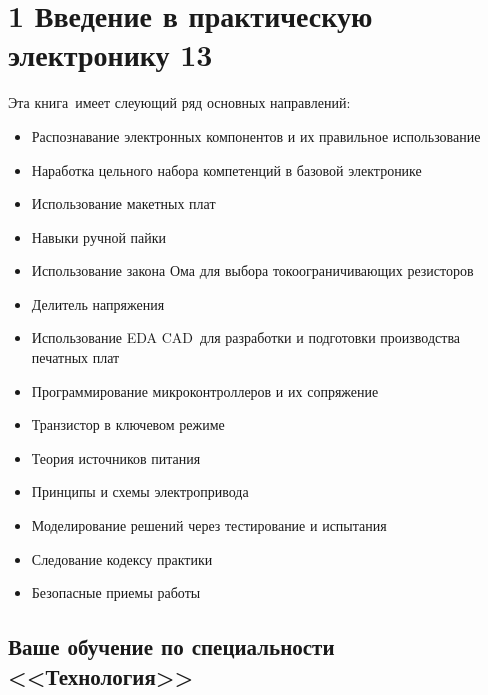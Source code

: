 \chapter{1 Введение в практическую электронику 13}

Эта книга\ имеет слеующий ряд основных направлений:

\begin{itemize}
  \item Распознавание электронных компонентов и их правильное использование
  \item Наработка цельного набора компетенций в базовой электронике
  \item Использование макетных плат
  \item Навыки ручной пайки
  \item Использование закона Ома для выбора токоограничивающих резисторов
  \item Делитель напряжения
  \item Использование EDA CAD\ для
  разработки и подготовки производства печатных плат
  \item Программирование микроконтроллеров и их сопряжение
  \item Транзистор в ключевом режиме
  \item Теория источников питания
  \item Принципы и схемы электропривода
  \item Моделирование решений через тестирование и испытания
  \item Следование кодексу практики
  \item Безопасные приемы работы
\end{itemize}

\section{Ваше обучение по специальности <<Технология>>}

